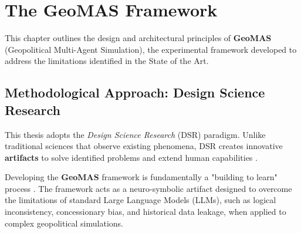 \chapter{The GeoMAS Framework}
\label{chap:framework}

This chapter outlines the design and architectural principles of \textbf{GeoMAS} (Geopolitical Multi-Agent Simulation), the experimental framework developed to address the limitations identified in the State of the Art. 

\section{Methodological Approach: Design Science Research}
\label{sec:design_science}
This thesis adopts the \textit{Design Science Research} (DSR) paradigm. Unlike traditional sciences that observe existing phenomena, DSR creates innovative \textbf{artifacts} to solve identified problems and extend human capabilities \cite{hevner2004design}. 

Developing the \textbf{GeoMAS} framework is fundamentally a "building to learn" process \cite{simon2019sciences}. The framework acts as a neuro-symbolic artifact designed to overcome the limitations of standard Large Language Models (LLMs), such as logical inconsistency, concessionary bias, and historical data leakage, when applied to complex geopolitical simulations.

